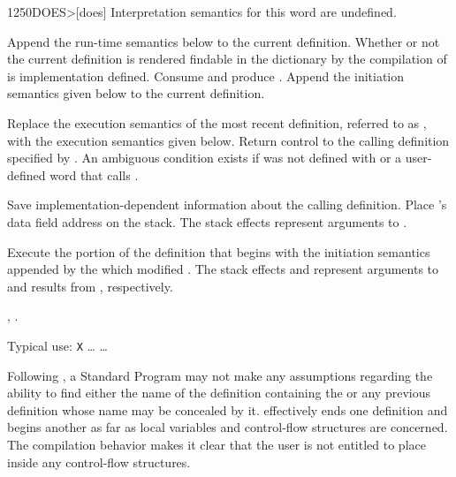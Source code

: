 \begin{worddef}[DOES]{1250}{DOES>}[does]
\interpret
	Interpretation semantics for this word are undefined.

\compile

	Append the run-time semantics below to the current definition.
	Whether or not the current definition is rendered findable in
	the dictionary by the compilation of  is
	implementation defined. Consume  and
	produce . Append the initiation semantics
	given below to the current definition.

\runtime
	\stack{}{}

	Replace the execution semantics of the most recent definition,
	referred to as , with the  execution
	semantics given below. Return control to the calling definition
	specified by . An ambiguous condition exists
	if  was not defined with  or a
	user-defined word that calls .

\init

	Save implementation-dependent information 
	about the calling definition. Place 's data field
	address on the stack. The stack effects  represent
	arguments to .

\execute[name]

	Execute the portion of the definition that begins with the
	initiation semantics appended by the  which modified
	. The stack effects  and 
	represent arguments to and results from ,
	respectively.

\see {},
	.

	\begin{rationale} %
		Typical use:
			\word{:} \texttt{X} {\ldots}  {\ldots} \word{;}

		Following , a Standard Program may not make any
		assumptions regarding the ability to find either the name of
		the definition containing the  or any previous
		definition whose name may be concealed by it. 
		effectively ends one definition and begins another as far as
		local variables and control-flow structures are concerned.
		The compilation behavior makes it clear that the user is not
		entitled to place  inside any control-flow
		structures.
	\end{rationale}


\end{worddef}
